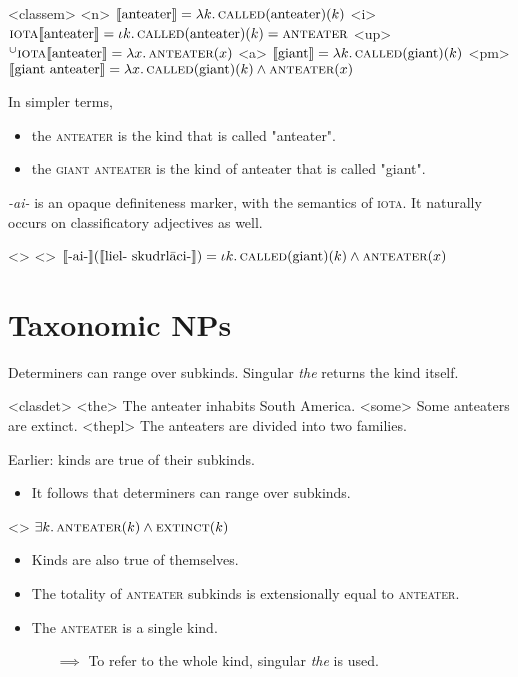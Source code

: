 \documentclass[a4paper,12pt]{article}
\begin{document}
\pex<classem>
    \a<n> $\llbracket \text{anteater} \rrbracket = \lambda k.\,\textsc{called}(\text{anteater})(k)$
    \a<i> $\textsc{iota}\llbracket \text{anteater} \rrbracket = \iota k.\,\textsc{called}(\text{anteater})(k) = \textsc{anteater}$
    \a<up> $^\cup \textsc{iota}\llbracket \text{anteater} \rrbracket = \lambda x.\,\textsc{anteater}(x)$
    \a<a> $\llbracket \text{giant} \rrbracket  = \lambda k.\,\textsc{called}(\text{giant})(k)$
    \a<pm> $\llbracket \text{giant anteater} \rrbracket = \lambda x.\,\textsc{called}(\text{giant})(k) \land \textsc{anteater}(x)$
\xe

In simpler terms,
\begin{itemize}
    \item the \textsc{anteater} is the kind that is called "anteater".
    \item the \textsc{giant anteater} is the kind of anteater that is called "giant".
\end{itemize}

\textit{-ai-} is an opaque definiteness marker, with the semantics of \textsc{iota}. It naturally occurs on classificatory adjectives as well.

\pex<>
    \a<> $\llbracket \text{-ai-} \rrbracket (\llbracket  \text{liel- skudrlāci-}\rrbracket ) =  \iota k.\,\textsc{called}(\text{giant})(k) \land \textsc{anteater}(x)$
\xe

\section{Taxonomic NPs}

Determiners can range over subkinds. Singular \textit{the} returns the kind itself.

\pex<clasdet>
    \a<the> The anteater inhabits South America.
    \a<some> Some anteaters are extinct.
    \a<thepl> The anteaters are divided into two families.
\xe

Earlier: kinds are true of their subkinds.

\begin{itemize}
    \item It follows that determiners can range over subkinds.
\end{itemize}

\ex<>
    $\exists k.\,\textsc{anteater}(k) \land \textsc{extinct}(k)$
\xe

\begin{itemize}
    \item Kinds are also true of themselves.
    \item The totality of \textsc{anteater} subkinds is extensionally equal to \textsc{anteater}.
    \item The \textsc{anteater} is a single kind.
    \begin{itemize}
        \item[$\implies$] To refer to the whole kind, singular \textit{the} is used.
    \end{itemize}
\end{itemize}
\end{document}
